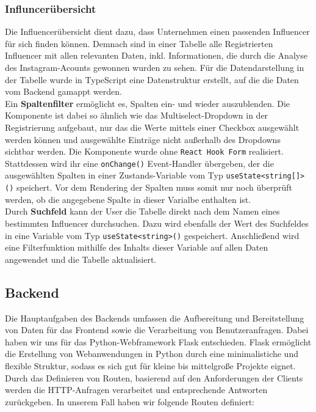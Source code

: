 \documentclass[conference,a4paper,flushend]{cs-techrep}
\begin{document}
\subsubsection{Influncerübersicht\\}
Die Influencerübersicht dient dazu, dass Unternehmen einen passenden Influencer für sich finden können. Demnach sind in einer Tabelle alle Registrierten Influencer mit allen relevanten Daten, inkl. Informationen, die durch die Analyse des Instagram-Acounts gewonnen wurden zu sehen. %
Für die Datendarstellung in der Tabelle wurde in TypeScript eine Datenstruktur erstellt, auf die die Daten vom Backend gamappt werden. %
\\
Ein \textbf{Spaltenfilter} ermöglicht es, Spalten ein- und wieder auszublenden. Die Komponente ist dabei so ähnlich wie das Multiselect-Dropdown in der Registrierung aufgebaut, nur das die Werte mittels einer Checkbox ausgewählt werden können und ausgewählte Einträge nicht außerhalb des Dropdowns sichtbar werden. Die Komponente wurde ohne \texttt{React Hook Form} realisiert. Stattdessen wird ihr eine \texttt{onChange()} Event-Handler übergeben, der die ausgewählten Spalten in einer Zustands-Variable vom Typ \texttt{useState<string[]>()} speichert. Vor dem Rendering der Spalten muss somit nur noch überprüft werden, ob die angegebene Spalte in dieser Varialbe enthalten ist. 
\\
Durch \textbf{Suchfeld} kann der User die Tabelle direkt nach dem Namen eines bestimmten Influencer durchsuchen. Dazu wird ebenfalls der Wert des Suchfeldes in eine Variable vom Typ \texttt{useState<string>()} gespeichert. Anschließend wird eine Filterfunktion mithilfe des Inhalts dieser Variable auf allen Daten angewendet und die Tabelle aktualisiert.


\subsection{Backend}

Die Hauptaufgaben des Backends umfassen die Aufbereitung und Bereitstellung von Daten für das Frontend sowie die Verarbeitung von Benutzeranfragen. Dabei haben wir uns für das Python-Webframework Flask entschieden. Flask ermöglicht die Erstellung von Webanwendungen in Python durch eine minimalistiche und flexible Struktur, sodass es sich gut für kleine bis mittelgroße Projekte eignet. Durch das Definieren von Routen, basierend auf den Anforderungen der Clients werden die HTTP-Anfragen verarbeitet und entsprechende Antworten zurückgeben. In unserem Fall haben wir folgende Routen definiert:
\end{document}
